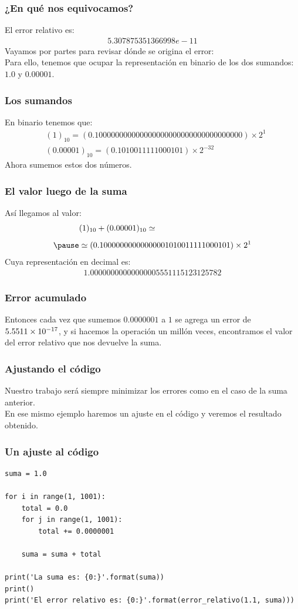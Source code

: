 \documentclass[12pt]{beamer}
\begin{document}
\begin{frame}
\frametitle{¿En qué nos equivocamos?}
El error relativo es:
\begin{align*}
5.307875351366998e-11
\end{align*}
\pause
Vayamos por partes para revisar dónde se origina el error:
\\
\bigskip
\pause
Para ello, tenemos que ocupar la representación en binario de los dos sumandos: $1.0$ y $0.00001$.
\end{frame}
\begin{frame}
\frametitle{Los sumandos}
En binario tenemos que:
\pause
\begin{align*}
{}&(1)_{10} = (0.1000 0000 0000 0000 0000 0000 0000 0000 0000) \times 2^{1} \\
{}&(0.00001)_{10} = (0.1010011111000101) \times 2^{-32}
\end{align*}
\pause
Ahora sumemos estos dos números.
\end{frame}
\begin{frame}
\frametitle{El valor luego de la suma}
Así llegamos al valor:
\pause
\begin{eqnarray*}
{}&(1)_{10} + (0.00001)_{10} \simeq \\[0.5em] \pause
&\simeq (0.10000000000000001010011111000101) \times 2^{1}
\end{eqnarray*}
\pause
Cuya representación en decimal es:
\pause
\begin{align*}
1.00000000000000005551115123125782
\end{align*}
\end{frame}
\begin{frame}
\frametitle{Error acumulado}
Entonces cada vez que sumemos $0.0000001$ a $1$ se agrega un error de $\num{5.5511d-17}$, \pause y si hacemos la operación un millón veces, \pause encontramos el valor del error relativo que nos devuelve la suma. 
\end{frame}
\begin{frame}
\frametitle{Ajustando el código}
Nuestro trabajo será siempre minimizar los errores como en el caso de la suma anterior.
\\
\bigskip
\pause
En ese mismo ejemplo haremos un ajuste en el código y veremos el resultado obtenido.
\end{frame}
\begin{frame}
\frametitle{Un ajuste al código}
\begin{lstlisting}[caption=Una agrupación en la suma]
suma = 1.0

for i in range(1, 1001):
    total = 0.0
    for j in range(1, 1001):
        total += 0.0000001
    
    suma = suma + total

print('La suma es: {0:}'.format(suma))
print()
print('El error relativo es: {0:}'.format(error_relativo(1.1, suma)))
\end{lstlisting}
\end{frame}
\end{document}
